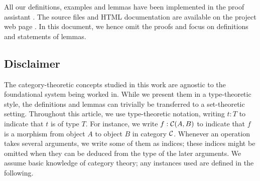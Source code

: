 \documentclass{amsart}
\newcommand{\fat}[1]{\textbf{#1}}
\begin{document}
%  
%  
  
%  
 All our definitions, examples and lemmas have been implemented in the proof assistant \coq \parencite{coq84pl3}.
 The \coq source files and HTML documentation are available on the project web page \parencite{trimat_coq}.
 In this document, we hence omit the proofs and focus on definitions and statements of lemmas.
 
 
 \subsection*{Disclaimer}The category-theoretic concepts studied in this work are agnostic to the foundational system being worked in.
 While we present them in a type-theoretic style, the definitions and lemmas can trivially be transferred to a set-theoretic setting.
 Throughout this article, we use type-theoretic notation,  writing $t:T$ to indicate that $t$ is of type $T$. 
 For instance, we write $f : {\mathcal{C}}(A,B)$ to indicate that $f$ is a morphism from object $A$ to object $B$ in category ${\mathcal{C}}$.
 Whenever an operation takes several arguments, we write some of them as indices; these indices might be omitted when 
 they can be deduced from the type of the later arguments.
 We assume basic knowledge of category theory; any instances used are defined in the following.
  
\end{document}
